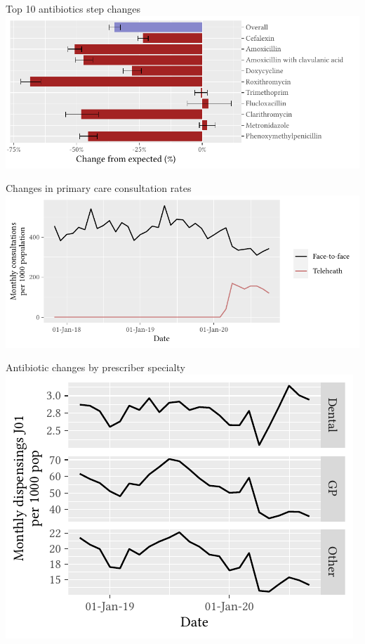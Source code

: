 \documentclass[aspectratio=169,12pt]{beamer} %
\begin{document}
\begin{frame}{Top 10 antibiotics step changes}
\centering
\includegraphics{ref/latex-j01arimatab-1.pdf}
\end{frame}

\begin{frame}{Changes in primary care consultation rates}
\centering
\includegraphics{ref/latex-suppmbs-1.pdf}
\nocite{gillies_2022}
\end{frame}

\begin{frame}{Antibiotic changes by prescriber specialty}
\centering
\includegraphics{ref/latex-j01specialty-1.pdf}
\end{frame}
\end{document}
